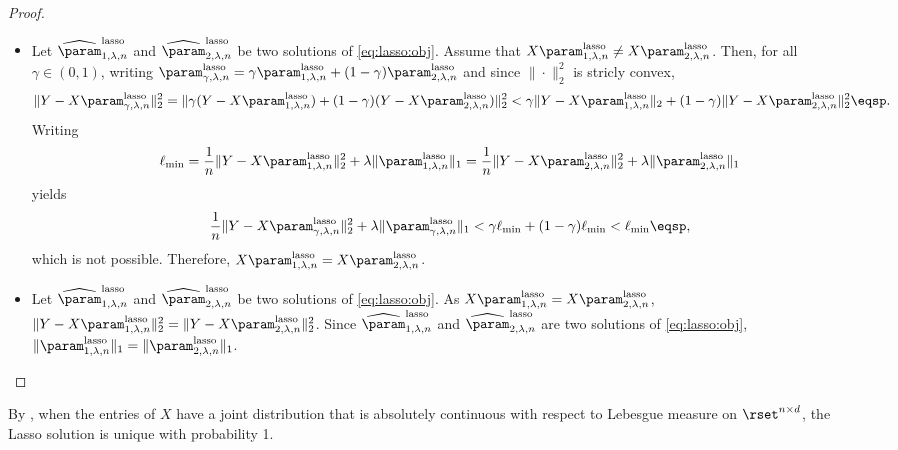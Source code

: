 \begin{proof}
\begin{itemize}
\item Let $\widehat \param^{\mathrm{lasso}}_{1,\lambda,n}$ and $\widehat \param^{\mathrm{lasso}}_{2,\lambda,n}$ be two solutions of \eqref{eq:lasso:obj}. Assume that $X\param^{\mathrm{lasso}}_{1,\lambda,n} \neq X\param^{\mathrm{lasso}}_{2,\lambda,n}$. Then, for all $\gamma\in(0,1)$, writing $\param^{\mathrm{lasso}}_{\gamma,\lambda,n} = \gamma \param^{\mathrm{lasso}}_{1,\lambda,n} + (1-\gamma)\param^{\mathrm{lasso}}_{2,\lambda,n}$ and since $\|\cdot\|_2^2$ is stricly convex, 
$$
\|Y - X\param^{\mathrm{lasso}}_{\gamma,\lambda,n}\|^2_2 = \|\gamma(Y - X\param^{\mathrm{lasso}}_{1,\lambda,n}) + (1-\gamma)(Y - X\param^{\mathrm{lasso}}_{2,\lambda,n})\|^2_2 <  \gamma\|Y - X\param^{\mathrm{lasso}}_{1,\lambda,n} \|_2 + (1-\gamma)\|Y - X\param^{\mathrm{lasso}}_{2,\lambda,n}\|^2_2\eqsp.
$$
Writing 
$$
\ell_{\mathrm{min}} = \frac{1}{n}\|Y - X\param^{\mathrm{lasso}}_{1,\lambda,n}\|_2^2 + \lambda\|\param^{\mathrm{lasso}}_{1,\lambda,n}\|_1 = \frac{1}{n}\|Y - X\param^{\mathrm{lasso}}_{2,\lambda,n}\|_2^2 + \lambda\|\param^{\mathrm{lasso}}_{2,\lambda,n}\|_1
$$
yields
$$
\frac{1}{n}\|Y - X\param^{\mathrm{lasso}}_{\gamma,\lambda,n}\|_2^2 + \lambda\|\param^{\mathrm{lasso}}_{\gamma,\lambda,n}\|_1 < \gamma\ell_{\mathrm{min}} + (1-\gamma)\ell_{\mathrm{min}} < \ell_{\mathrm{min}}\eqsp, 
$$
which is not possible. Therefore, $X\param^{\mathrm{lasso}}_{1,\lambda,n} = X\param^{\mathrm{lasso}}_{2,\lambda,n}$.
\item Let $\widehat \param^{\mathrm{lasso}}_{1,\lambda,n}$ and $\widehat \param^{\mathrm{lasso}}_{2,\lambda,n}$ be two solutions of \eqref{eq:lasso:obj}. As $X\param^{\mathrm{lasso}}_{1,\lambda,n} = X\param^{\mathrm{lasso}}_{2,\lambda,n}$, $\|Y - X\param^{\mathrm{lasso}}_{1,\lambda,n}\|_2^2 = \|Y - X\param^{\mathrm{lasso}}_{2,\lambda,n}\|_2^2$. Since $\widehat \param^{\mathrm{lasso}}_{1,\lambda,n}$ and $\widehat \param^{\mathrm{lasso}}_{2,\lambda,n}$ are two solutions of \eqref{eq:lasso:obj}, $\|\param^{\mathrm{lasso}}_{1,\lambda,n}\|_1=\|\param^{\mathrm{lasso}}_{2,\lambda,n}\|_1$.
\end{itemize}
\end{proof}

\begin{remark}
By \cite[Lemma~4]{tibshirani2013lasso},  when the entries of $X$ have a joint distribution that is absolutely continuous with respect to Lebesgue measure on $\rset^{n\times d}$,  the Lasso solution is unique with probability 1.
\end{remark}

